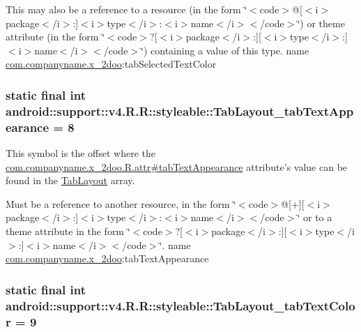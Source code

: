 This may also be a reference to a resource (in the form \char`\"{}$<$code$>$@\mbox{[}$<$i$>$package$<$/i$>$:\mbox{]}$<$i$>$type$<$/i$>$:$<$i$>$name$<$/i$>$$<$/code$>$\char`\"{}) or theme attribute (in the form \char`\"{}$<$code$>$?\mbox{[}$<$i$>$package$<$/i$>$:\mbox{]}\mbox{[}$<$i$>$type$<$/i$>$:\mbox{]}$<$i$>$name$<$/i$>$$<$/code$>$\char`\"{}) containing a value of this type.  name \hyperlink{namespacecom_1_1companyname_1_1x__2doo}{com.companyname.x\_\-2doo}:tabSelectedTextColor \hypertarget{classandroid_1_1support_1_1v4_1_1_r_1_1styleable_411f9a9c12b8ed9f61f5cb57536ee912}{
\subsubsection[{TabLayout\_\-tabTextAppearance}]{\setlength{\rightskip}{0pt plus 5cm}static final int android::support::v4.R.R::styleable::TabLayout\_\-tabTextAppearance = 8}}
\label{classandroid_1_1support_1_1v4_1_1_r_1_1styleable_411f9a9c12b8ed9f61f5cb57536ee912}


This symbol is the offset where the \hyperlink{classcom_1_1companyname_1_1x__2doo_1_1_r_1_1attr_8804b231b3750c9c41c4354b36fb325c}{com.companyname.x\_\-2doo.R.attr\#tabTextAppearance} attribute's value can be found in the \hyperlink{classandroid_1_1support_1_1v4_1_1_r_1_1styleable_d1f1104cdc4fac0ab4797d48f7efe351}{TabLayout} array.

Must be a reference to another resource, in the form \char`\"{}$<$code$>$@\mbox{[}+\mbox{]}\mbox{[}$<$i$>$package$<$/i$>$:\mbox{]}$<$i$>$type$<$/i$>$:$<$i$>$name$<$/i$>$$<$/code$>$\char`\"{} or to a theme attribute in the form \char`\"{}$<$code$>$?\mbox{[}$<$i$>$package$<$/i$>$:\mbox{]}\mbox{[}$<$i$>$type$<$/i$>$:\mbox{]}$<$i$>$name$<$/i$>$$<$/code$>$\char`\"{}.  name \hyperlink{namespacecom_1_1companyname_1_1x__2doo}{com.companyname.x\_\-2doo}:tabTextAppearance \hypertarget{classandroid_1_1support_1_1v4_1_1_r_1_1styleable_67777f9a649ba213b12bd3b8176c975f}{
\subsubsection[{TabLayout\_\-tabTextColor}]{\setlength{\rightskip}{0pt plus 5cm}static final int android::support::v4.R.R::styleable::TabLayout\_\-tabTextColor = 9}}
\label{classandroid_1_1support_1_1v4_1_1_r_1_1styleable_67777f9a649ba213b12bd3b8176c975f}


